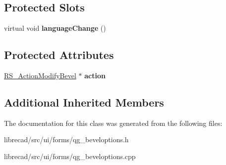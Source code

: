 \subsection*{Protected Slots}
\begin{DoxyCompactItemize}
\item 
\hypertarget{classQG__BevelOptions_a9ab9ce130dd94a6e820298454a6ba67d}{virtual void {\bfseries language\-Change} ()}\label{classQG__BevelOptions_a9ab9ce130dd94a6e820298454a6ba67d}

\end{DoxyCompactItemize}
\subsection*{Protected Attributes}
\begin{DoxyCompactItemize}
\item 
\hypertarget{classQG__BevelOptions_a69ff76c3e5ef9518a0d7086efb5ceba2}{\hyperlink{classRS__ActionModifyBevel}{R\-S\-\_\-\-Action\-Modify\-Bevel} $\ast$ {\bfseries action}}\label{classQG__BevelOptions_a69ff76c3e5ef9518a0d7086efb5ceba2}

\end{DoxyCompactItemize}
\subsection*{Additional Inherited Members}


The documentation for this class was generated from the following files\-:\begin{DoxyCompactItemize}
\item 
librecad/src/ui/forms/qg\-\_\-beveloptions.\-h\item 
librecad/src/ui/forms/qg\-\_\-beveloptions.\-cpp\end{DoxyCompactItemize}
